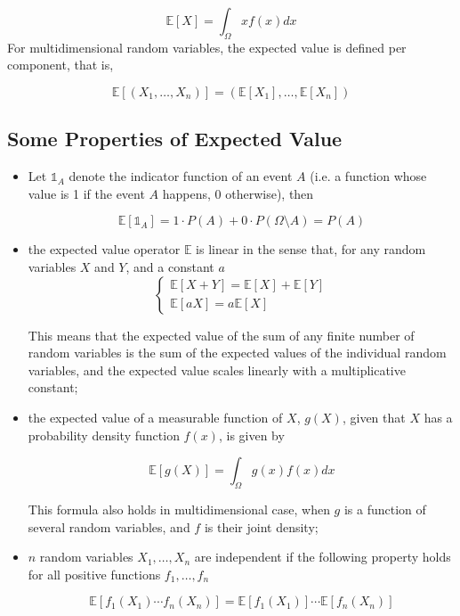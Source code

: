 \begin{equation}
\mathbb{E}[X]=\int_{\Omega}xf(x)dx
\end{equation}
For multidimensional random variables, the expected value is defined per component, that is,

\begin{equation}
\mathbb{E}[(X_{1},\ldots ,X_{n})]=(\mathbb{E} [X_{1}],\ldots ,\mathbb{E}[X_{n}])
\end{equation}

\subsection{Some Properties of Expected Value}
\label{some-properties}

\begin{itemize}
\tightlist
\item Let $\mathbb{1}_{A}$ denote the indicator function of an event $A$ (i.e. a function whose value is 1 if the event $A$ happens, 0 otherwise), then

\begin{equation}
\mathbb{E}[\mathbb{1}_{A}] = 1\cdot P(A)+0\cdot P(\Omega \setminus A)= P(A)
\end{equation}

\item the expected value operator \(\mathbb{E}\) is linear in the sense that, for any random variables $X$ and $Y$, and a constant $a$
\begin{equation}
\begin{cases}
\mathbb{E}[X+Y] = \mathbb{E}[X] + \mathbb{E}[Y] \\
\mathbb{E}[aX] = a\mathbb{E}[X]
\end{cases}
\end{equation}

This means that the expected value of the sum of any finite number of random variables is the sum of the expected values of the individual random variables, and the expected value scales linearly with a multiplicative constant;

\item the expected value of a measurable function of $X$, $g(X)$, given that $X$ has a probability density function $f(x)$, is given by 

\begin{equation}
\mathbb{E}[g(X)] = \int_{\Omega}g(x)f(x) dx
\end{equation}

This formula also holds in multidimensional case, when $g$ is a function of several random variables, and $f$ is their joint density;

\item $n$ random variables $X_1 ,\ldots , X_n$ are independent if the following property holds for all positive functions $f_1 ,\ldots , f_n$

\begin{equation}
\mathbb{E}[f_1 (X_1 )\cdots f_n (X_n )] = \mathbb{E}[f_1 ( X_1 )] \cdots \mathbb{E}[f_n (X_n )]
\end{equation}
\end{itemize}


